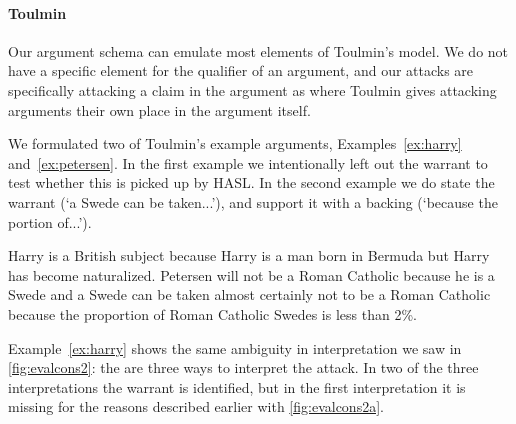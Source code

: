 \paragraph{Toulmin}
Our argument schema can emulate most elements of Toulmin's model. We do not have a specific element for the qualifier of an argument, and our attacks are specifically attacking a claim in the argument as where Toulmin gives attacking arguments their own place in the argument itself.

We formulated two of Toulmin's example arguments, Examples~\ref{ex:harry} and~\ref{ex:petersen}. In the first example we intentionally left out the warrant to test whether this is picked up by HASL. In the second example we do state the warrant (`a Swede can be taken...'), and support it with a backing (`because the portion of...').

\begin{exe}
	\ex\label{ex:harry} Harry is a British subject because Harry is a man born in Bermuda but Harry has become naturalized.
	\ex\label{ex:petersen} Petersen will not be a Roman Catholic because he is a Swede and a Swede can be taken almost certainly not to be a Roman Catholic because the proportion of Roman Catholic Swedes is less than 2\%.
\end{exe}

\noindent Example~\ref{ex:harry} shows the same ambiguity in interpretation we saw in \autoref{fig:evalcons2}: the are three ways to interpret the attack. In two of the three interpretations the warrant is identified, but in the first interpretation it is missing for the reasons described earlier with \autoref{fig:evalcons2a}.

